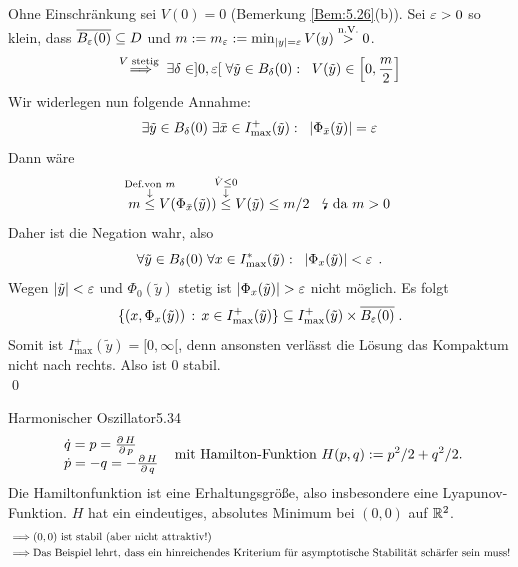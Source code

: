 \documentclass[a4paper]{article}
\begin{document}
\begin{Beweis}
Ohne Einschränkung sei $V(0)=0$ (Bemerkung \ref{Bem:5.26}(b)). Sei $\operatorname{\varepsilon}>0$ so klein, dass $\overline{B_{\operatorname{\varepsilon}}(0)}\subseteq D$ und $m:=m_{\operatorname{\varepsilon}}:=\min_{|y|=\operatorname{\varepsilon}}V(y)\overset{\text{n.V.}}{>}0$. 
\[\overset{V\text{ stetig }}{\implies} \exists \delta\in]0,\operatorname{\varepsilon}[\;\forall \tilde{y}\in B_{\delta}(0):\;\;V(\tilde{y})\in \left[0,\frac{m}{2}\right]\]
Wir widerlegen nun folgende Annahme:
\[\exists \tilde{y}\in B_{\delta}(0)\;\exists \bar{x}\in I_{\max}^+(\tilde{y}):\;\;|\Phi_{\bar{x}}(\tilde{y})|=\operatorname{\varepsilon}\]
Dann wäre
\[m \overset{\ms{\text{Def.}\text{von }m\\\downarrow}}{\le }V(\Phi_{\bar{x}}(\tilde{y}))
\overset{\ms{\dot{V}\le 0\\\downarrow}}{\le } 
V(\tilde{y})\le m/2\;\;\te{\lightning{} da }m>0\]
Daher ist die Negation wahr, also
\[\forall \tilde{y}\in B_{\delta}(0)\;\forall x\in I_{\max}^*(\tilde{y}):\;\;|\Phi_x(\tilde{y})|<\operatorname{\varepsilon}\;.\]
Wegen $|\tilde{y}|<\operatorname{\varepsilon}$ und $\Phi_0(\tilde{y})$ stetig ist $|\Phi_x(\tilde{y})|>\ve$ nicht möglich. Es folgt
\[\{(x,\Phi_x(\tilde{y}))\,:\,x\in I_{\max}^+(\tilde{y})\}\subseteq I_{\max}^+(\tilde{y})\times\overline{B_{\operatorname{\varepsilon}}(0)}\;.\]
Somit ist $I_{\max}^+(\tilde{y})=[0,\infty[$, denn ansonsten verlässt die Lösung das Kompaktum nicht nach rechts. Also ist 0 stabil.\\\qed
\end{Beweis}

\begin{Beispiel}{Harmonischer Oszillator}{5.34}
\[\begin{array}{l}
\dot{q}=p=\frac{\pp H}{\pp p}\\
\dot{p}=-q=-\frac{\pp H}{\pp q}
\end{array}
\te{ mit Hamilton-Funktion $H(p,q):=p^2/2+q^2/2$.}
\]
Die Hamiltonfunktion ist eine Erhaltungsgröße, also insbesondere eine Lyapunov-Funktion. $H$ hat ein eindeutiges, absolutes Minimum bei $(0,0)$ auf $\mathbb R^2$.
\begin{align*}
\implies&(0,0)\text{ ist stabil (aber nicht attraktiv!)}\\
\implies&\text{Das Beispiel lehrt, dass ein hinreichendes Kriterium für asymptotische Stabilität schärfer sein muss!}
\end{align*}
\end{Beispiel}
\end{document}
